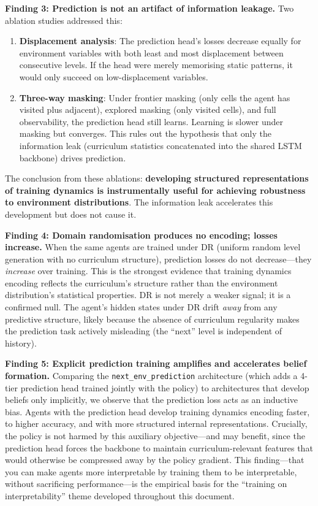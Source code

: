 \documentclass[11pt,a4paper]{article}
\theoremstyle{remark}
\newcommand{\dr}{\textsc{DR}}
\begin{document}
\textbf{Finding 3: Prediction is not an artifact of information leakage.} Two ablation studies addressed this:
\begin{enumerate}[nosep]
    \item \textbf{Displacement analysis}: The prediction head's losses decrease equally for environment variables with both least and most displacement between consecutive levels. If the head were merely memorising static patterns, it would only succeed on low-displacement variables.
    \item \textbf{Three-way masking}: Under frontier masking (only cells the agent has visited plus adjacent), explored masking (only visited cells), and full observability, the prediction head still learns. Learning is slower under masking but converges. This rules out the hypothesis that only the information leak (curriculum statistics concatenated into the shared LSTM backbone) drives prediction.
\end{enumerate}

The conclusion from these ablations: \textbf{developing structured representations of training dynamics is instrumentally useful for achieving robustness to environment distributions}. The information leak accelerates this development but does not cause it.

\textbf{Finding 4: Domain randomisation produces no encoding; losses increase.} When the same agents are trained under \dr{} (uniform random level generation with no curriculum structure), prediction losses do not decrease---they \textit{increase} over training. This is the strongest evidence that training dynamics encoding reflects the curriculum's structure rather than the environment distribution's statistical properties. \dr{} is not merely a weaker signal; it is a confirmed null. The agent's hidden states under \dr{} drift \textit{away} from any predictive structure, likely because the absence of curriculum regularity makes the prediction task actively misleading (the ``next'' level is independent of history).

\textbf{Finding 5: Explicit prediction training amplifies and accelerates belief formation.} Comparing the \texttt{next\_env\_prediction} architecture (which adds a 4-tier prediction head trained jointly with the policy) to architectures that develop beliefs only implicitly, we observe that the prediction loss acts as an inductive bias. Agents with the prediction head develop training dynamics encoding faster, to higher accuracy, and with more structured internal representations. Crucially, the policy is not harmed by this auxiliary objective---and may benefit, since the prediction head forces the backbone to maintain curriculum-relevant features that would otherwise be compressed away by the policy gradient. This finding---that you can make agents more interpretable by training them to be interpretable, without sacrificing performance---is the empirical basis for the ``training on interpretability'' theme developed throughout this document.
\end{document}
